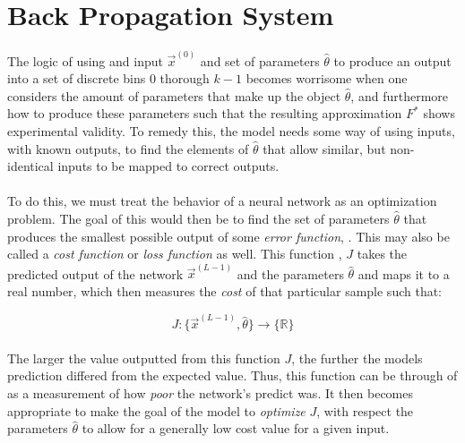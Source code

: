 \documentclass[12pt,letterpaper]{article}
\begin{document}

\section*{Back Propagation System}

\paragraph*{}The logic of using and input $\vec{x}^{(0)}$ and set of parameters $\hat{\theta}$ to produce an output into a set of discrete bins $0$ thorough $k-1$ becomes worrisome when one considers the amount of parameters that make up the object $\hat{\theta}$, and furthermore how to produce these parameters such that the resulting approximation $F^*$ shows experimental validity. To remedy this, the model needs some way of using inputs, with known outputs, to find the elements of $\hat{\theta}$ that allow similar, but non-identical inputs to be mapped to correct outputs.

\paragraph*{}To do this, we must treat the behavior of a neural network as an optimization problem. The goal of this would then be to find the set of parameters $\hat{\theta}$ that produces the smallest possible output of some \textit{error function}, \cite{Goodfellow,James,Loy}. This may also be called a \textit{cost function} or \textit{loss function} as well. This function , $J$ takes the predicted output of the network $\vec{x}^{(L-1)}$ and the parameters $\hat{\theta}$ and maps it to a real number, which then measures the \textit{cost} of that particular sample such that:

\begin{equation}
\label{cost func}
J : \big\{ \vec{x}^{(L-1)} , \hat{\theta} \big\} \rightarrow \big\{ \mathbb{R} \big\}
\end{equation}	

\paragraph*{}The larger the value outputted from this function $J$, the further the models prediction differed from the expected value. Thus, this function can be through of as a measurement of how \textit{poor} the network's predict was. It then becomes appropriate to make the goal of the model to \textit{optimize} $J$, with respect the parameters $\hat{\theta}$ to allow for a generally low cost value for a given input.
\end{document}
